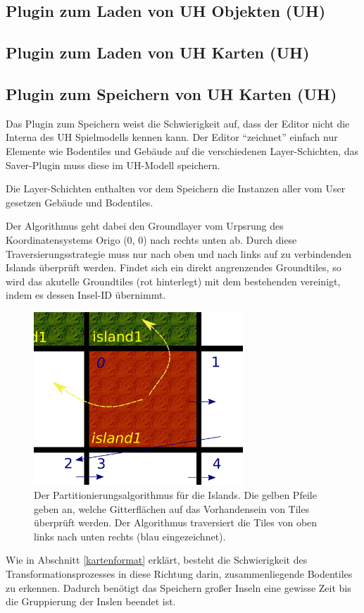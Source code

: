 \subsection{Plugin zum Laden von UH Objekten (UH)}
\subsection{Plugin zum Laden von UH Karten (UH)}
\subsection{Plugin zum Speichern von UH Karten (UH)}
Das Plugin zum Speichern weist die Schwierigkeit auf, dass der Editor nicht die
Interna des UH Spielmodells kennen kann. Der Editor ``zeichnet'' einfach nur
Elemente wie Bodentiles und Gebäude auf die verschiedenen Layer-Schichten, das
Saver-Plugin muss diese im UH-Modell speichern. 


Die Layer-Schichten enthalten vor dem Speichern die Instanzen aller vom User
gesetzen Gebäude und Bodentiles. 

Der Algorithmus geht dabei den Groundlayer vom Urpsrung des Koordinatensystems
Origo (0, 0) nach rechts unten ab. Durch diese Traversierungsstrategie muss nur
nach oben und nach links auf zu verbindenden Islands überprüft werden. Findet
sich ein direkt angrenzendes Groundtiles, so wird das akutelle Groundtiles (rot
hinterlegt) mit dem bestehenden vereinigt, indem es dessen Insel-ID übernimmt.

%
%
\begin{figure}[htbp]
  \centering
  
    \includegraphics[width=0.7\textwidth]{gfx/merge_algorithm.png}
  
  \caption{Der Partitionierungsalgorithmus für die Islands. Die gelben Pfeile
  geben an, welche Gitterflächen auf das Vorhandensein von Tiles überprüft
  werden. Der Algorithmus traversiert die Tiles von oben links nach unten
  rechts (blau eingezeichnet).}
  \label{figure:automaton-intersection}
\end{figure}

Wie in Abschnitt \ref{kartenformat} erklärt, besteht die Schwierigkeit des
Transformationsprozesses in diese Richtung darin, zusammenliegende Bodentiles zu
erkennen. Dadurch benötigt das Speichern großer Inseln eine gewisse Zeit bis die
Gruppierung der Inslen beendet ist.
